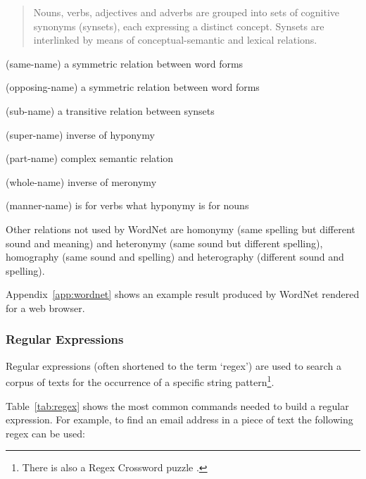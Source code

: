 \begin{quotation}
  Nouns, verbs, adjectives and adverbs are grouped into sets of cognitive synonyms (synsets), each expressing a distinct concept. Synsets are interlinked by means of conceptual-semantic and lexical relations. 
\end{quotation}

\begin{description}[leftmargin=2.75cm]
  \item [Synonymy] (same-name) a symmetric relation between word forms
  \item [Antonymy] (opposing-name) a symmetric relation between word forms
  \item [Hyponymy] (sub-name) a transitive relation between synsets
  \item [Hypernymy] (super-name) inverse of hyponymy
  \item [Meronymy] (part-name) complex semantic relation
  \item [Holonymy] (whole-name) inverse of meronymy
  \item [Troponymy] (manner-name) is for verbs what hyponymy is for nouns
\end{description}

Other relations not used by WordNet are homonymy (same spelling but different sound and meaning) and heteronymy (same sound but different spelling), homography (same sound and spelling) and heterography (different sound and spelling).

Appendix~\ref{app:wordnet} shows an example result produced by WordNet rendered for a web browser. 


\subsubsection{Regular Expressions}
\label{s:regex}

Regular expressions (often shortened to the term `regex') are used to search a corpus of texts for the occurrence of a specific string pattern\footnote{There is also a Regex Crossword puzzle \autocite{Michelsen2016}.}.


Table~\ref{tab:regex} shows the most common commands needed to build a regular expression. For example, to find an email address in a piece of text the following regex can be used:

